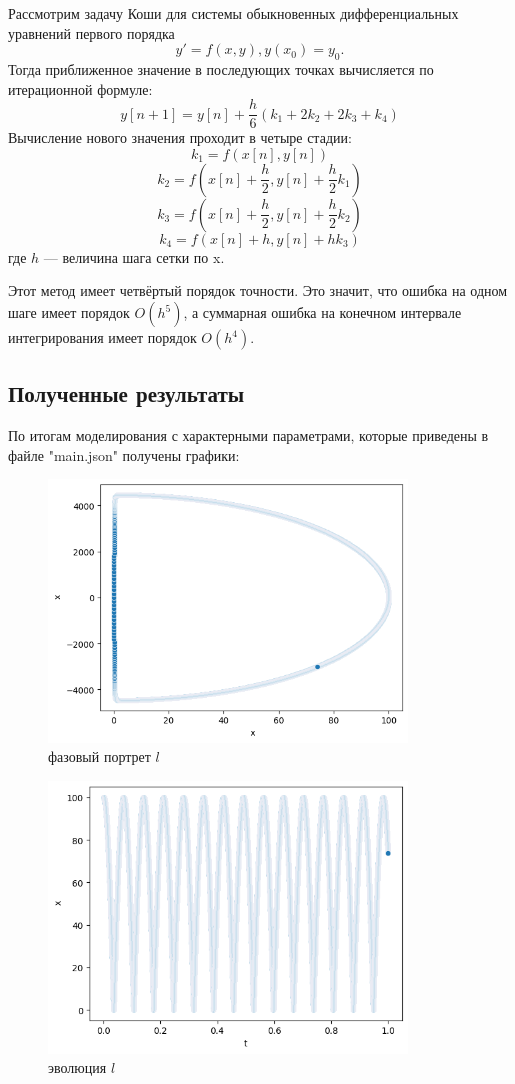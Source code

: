 \documentclass[a4paper, 12pt]{article}
\begin{document}
Рассмотрим задачу Коши для системы обыкновенных дифференциальных уравнений первого порядка 
    \[y\prime  = f(x,y),y(x_0)=y_0.\]
Тогда приближенное значение в последующих точках вычисляется по итерационной формуле:
    \[y[n+1] = y[n] + \frac{h}{6}( k_1 + 2 k_2 + 2 k_3 +k_4)\]
Вычисление нового значения проходит в четыре стадии:
    \[k_1 = f ( x[n] , y[n] )\]
    \[k_2 = f ( x [n] + \frac{h}{2} , y[ n] + \frac{h}{2} k_1 ) \]
    \[k_3 = f ( x [n] +\frac{h}{2} , y[ n] + \frac{h}{2} k_2 ) \]
    \[k_4 = f ( x [n] + h , y[ n] + h k_3 ) \]
где $h$ — величина шага сетки по x.

Этот метод имеет четвёртый порядок точности. Это значит, что ошибка на одном шаге имеет порядок $O(h^5)$, а суммарная ошибка на конечном интервале интегрирования имеет порядок $O(h^4)$.
\newpage
\subsection{Полученные результаты}
По итогам моделирования с характерными параметрами, которые приведены в файле "main.json" получены графики:
 \begin{figure}[H]
  \centering
  \includegraphics[width = 0.85\textwidth, height = 0.20\textheight]{pictures/data/image.png}
  \caption{фазовый портрет $l$}
 \end{figure}
    
 \begin{figure}[H]
  \centering
  \includegraphics[width = 0.85\textwidth, height = 0.20\textheight]{pictures/data/image copy.png}
  \caption{эволюция $l$}
 \end{figure}
    
\end{document}
